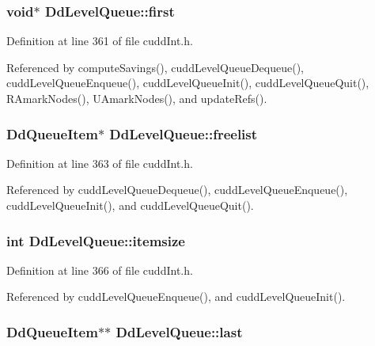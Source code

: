 \subsubsection{\setlength{\rightskip}{0pt plus 5cm}void$\ast$ \bf{Dd\-Level\-Queue::first}}\label{structDdLevelQueue_beda70ee389be7223f6a0ac4eb6cca82}




Definition at line 361 of file cudd\-Int.h.

Referenced by compute\-Savings(), cudd\-Level\-Queue\-Dequeue(), cudd\-Level\-Queue\-Enqueue(), cudd\-Level\-Queue\-Init(), cudd\-Level\-Queue\-Quit(), RAmark\-Nodes(), UAmark\-Nodes(), and update\-Refs().
\subsubsection{\setlength{\rightskip}{0pt plus 5cm}\bf{Dd\-Queue\-Item}$\ast$ \bf{Dd\-Level\-Queue::freelist}}\label{structDdLevelQueue_a70e5645d52749160c718d38ea0c06ba}




Definition at line 363 of file cudd\-Int.h.

Referenced by cudd\-Level\-Queue\-Dequeue(), cudd\-Level\-Queue\-Enqueue(), cudd\-Level\-Queue\-Init(), and cudd\-Level\-Queue\-Quit().
\subsubsection{\setlength{\rightskip}{0pt plus 5cm}int \bf{Dd\-Level\-Queue::itemsize}}\label{structDdLevelQueue_ee04a106792fd63d37d287cc820c0729}




Definition at line 366 of file cudd\-Int.h.

Referenced by cudd\-Level\-Queue\-Enqueue(), and cudd\-Level\-Queue\-Init().
\subsubsection{\setlength{\rightskip}{0pt plus 5cm}\bf{Dd\-Queue\-Item}$\ast$$\ast$ \bf{Dd\-Level\-Queue::last}}\label{structDdLevelQueue_cf28d01edde7bf6634b4213299f487b3}




